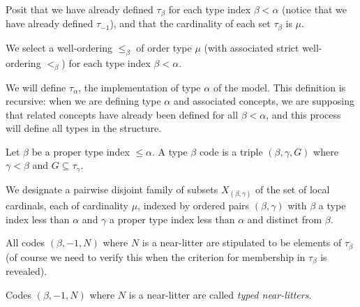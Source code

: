 \begin{definition}
\label {def:oldtau}
Posit that we have already defined $\tau_\beta$ for each type index $\beta<\alpha$ (notice that we have already defined $\tau_{-1}$), and that the cardinality of each set $\tau_\beta$ is $\mu$.
\end{definition}

\begin{definition}
\label {def:typewords}
We select a well-ordering $\leq_\beta$ of order type $\mu$ (with associated strict well-ordering $<_\beta$) for each type index $\beta<\alpha$.
\end{definition}

We will define $\tau_\alpha$, the implementation of type $\alpha$ of the model.  This definition is recursive:  when we are defining type $\alpha$ and associated concepts, we are supposing that related concepts have already been defined for all $\beta<\alpha$, and this process will define all types in the structure.

\begin{definition}
\label {def:codes}
Let $\beta$ be a proper type index $\leq \alpha$.
A type $\beta$ code is a triple $(\beta,\gamma,G)$ where $\gamma<\beta$ and $G \subseteq \tau_{\gamma}$.
\end{definition}







\begin{definition}
\label {def:ftargets}
We designate a pairwise disjoint family of subsets $X_{(\beta,\gamma)}$ of the set of local cardinals, each of cardinality $\mu$, indexed by ordered pairs $(\beta,\gamma)$ with $\beta$ a type index less than $\alpha$ and $\gamma$ a proper type index less than $\alpha$ and distinct from $\beta$.
\end{definition}

\begin{lemma}
\label {lem:near-litter-code}
All codes $(\beta,-1,N)$ where $N$ is a near-litter are stipulated to be elements of $\tau_\beta$ (of course we need to verify this when the criterion for membership in $\tau_\beta$ is revealed).
\end{lemma}

\begin{definition}
\label {def:typed-near-litter}
Codes $(\beta,-1,N)$ where $N$ is a near-litter are called {\em typed near-litters\/}.
\end{definition}

